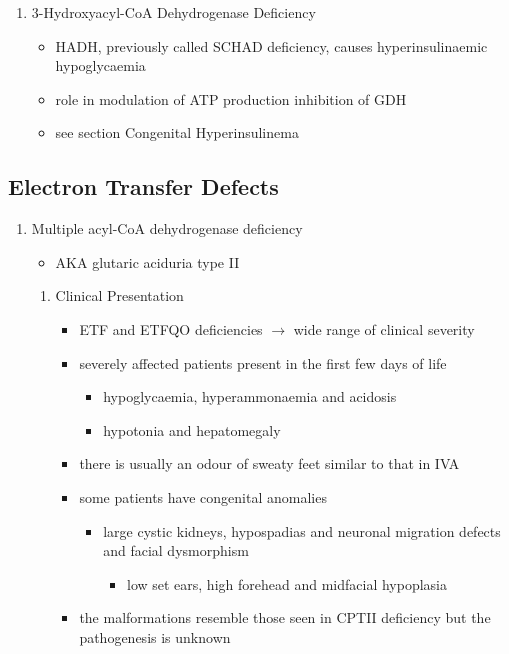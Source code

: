 \documentclass{scrartcl}
\begin{document}
\begin{enumerate}
\item 3-Hydroxyacyl-CoA Dehydrogenase Deficiency
\label{sec:orgbbc9795}
\begin{itemize}
\item HADH, previously called SCHAD deficiency, causes hyperinsulinaemic
hypoglycaemia
\item role in modulation of ATP production inhibition of GDH
\item see section Congenital Hyperinsulinema
\end{itemize}
\end{enumerate}
\subsection{Electron Transfer Defects}
\label{sec:orgb9d5c33}
\begin{enumerate}
\item Multiple acyl-CoA dehydrogenase deficiency
\label{sec:orge918645}
\begin{itemize}
\item AKA glutaric aciduria type II
\end{itemize}
\begin{enumerate}
\item Clinical Presentation
\label{sec:orgff3d99b}
\begin{itemize}
\item ETF and ETFQO deficiencies \(\to\) wide range of clinical severity
\item severely affected patients present in the first few days of life
\begin{itemize}
\item hypoglycaemia, hyperammonaemia and acidosis
\item hypotonia and hepatomegaly
\end{itemize}
\item there is usually an odour of sweaty feet similar to that in IVA
\item some patients have congenital anomalies
\begin{itemize}
\item large cystic kidneys, hypospadias and neuronal migration defects and facial dysmorphism
\begin{itemize}
\item low set ears, high forehead and midfacial hypoplasia
\end{itemize}
\end{itemize}
\item the malformations resemble those seen in CPTII deficiency but the pathogenesis is unknown

\end{itemize}
\end{enumerate}
\end{enumerate}
\end{document}
